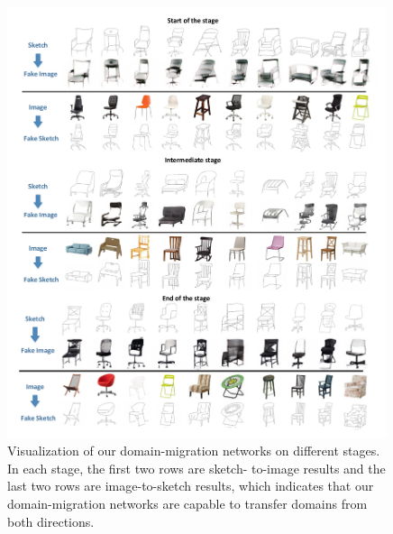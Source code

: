 \documentclass[runningheads]{llncs}
\begin{document}
\begin{figure}
\vspace{-5ex}
    \centering
    \includegraphics[width = 0.99\textwidth]{figs/gan_results_stage.pdf}
    \vspace{-3ex}
    \caption{Visualization of our domain-migration networks on different stages. In each stage, the first two rows are sketch-
to-image results and the last two rows are image-to-sketch results, which indicates that
our domain-migration networks are capable to transfer domains from both directions.}
    \label{fig:gan_results}
    \vspace{-5ex}
\end{figure}
\end{document}
